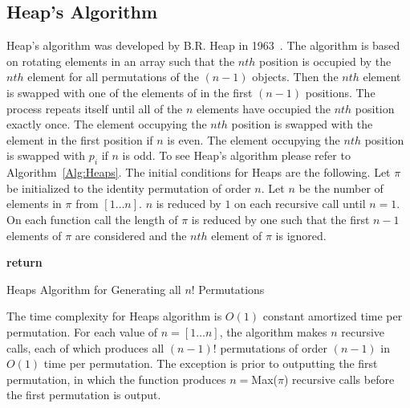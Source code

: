 \subsection{Heap's Algorithm}
Heap's algorithm was developed by B.R. Heap in 1963~\cite{A24}. 
The algorithm is based on rotating elements in an array such that the $nth$ position 
is occupied by the $nth$ element for all permutations of the $(n-1)$ objects. 
Then the $nth$ element is swapped with one of the elements of in the first $(n-1)$ positions.
The process repeats itself until all of the $n$ elements have occupied the $nth$ position exactly once. 
The element occupying the $nth$ position is swapped with the element in the first position if $n$ 
is even. The element occupying the $nth$ position is swapped with $p_{i}$ if $n$ is odd.
To see Heap's algorithm please refer to Algorithm~\ref{Alg:Heaps}. The initial conditions 
for {\sc Heaps} are the following. Let $\pi$ be initialized to the identity permutation 
of order $n$. Let $n$ be the number of elements in $\pi$ from $[1 \dots n]$. $n$ is 
reduced by $1$ on each recursive call until $n=1$. On each function call the length of 
$\pi$ is reduced by one such that the first $n-1$ elements of $\pi$ are considered and the 
$nth$ element of $\pi$ is ignored.

\begin{algorithm}
    \begin{algorithmic}[1]
                \State \textbf{return}
            \Else 
                    \Else 
                    \EndIf
                \EndFor
            \EndIf
        \EndFunction
        
    \end{algorithmic}
    \caption{Heaps Algorithm for Generating all $n!$ Permutations}
    \label{Alg:Heaps}
\end{algorithm}

The time complexity for {\sc Heaps} algorithm is $O(1)$ constant amortized time per permutation. For each value of $n=[1 \dots n]$, 
the algorithm makes $n$ recursive calls, each of which produces all $(n-1)!$ permutations of 
order $(n-1)$ in $O(1)$ time per permutation. The exception is prior to outputting the first permutation, in which 
the function produces $n=${\sc Max($\pi$)} recursive calls before the first permutation is output.


